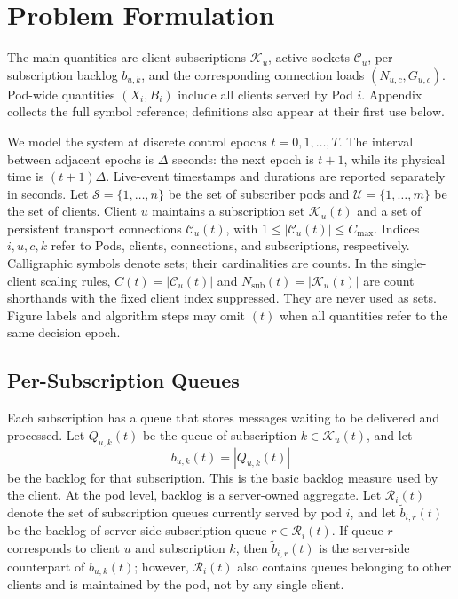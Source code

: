 \section{Problem Formulation}
\label{sec:problem-formulation}

The main quantities are client subscriptions $\mathcal{K}_u$, active sockets
$\mathcal{C}_u$, per-subscription backlog $b_{u,k}$, and the corresponding
connection loads $(N_{u,c},G_{u,c})$. Pod-wide quantities $(X_i,B_i)$ include
all clients served by Pod $i$. Appendix~ collects the full
symbol reference; definitions also appear at their first use below.

We model the system at discrete control epochs $t=0,1,\ldots,T$. The interval
between adjacent epochs is $\Delta$ seconds: the next epoch is $t+1$, while
its physical time is $(t+1)\Delta$. Live-event timestamps and durations are
reported separately in seconds. Let
$\mathcal{S}=\{1,\ldots,n\}$ be the set of subscriber pods and
$\mathcal{U}=\{1,\ldots,m\}$ be the set of clients. Client $u$ maintains a
subscription set $\mathcal{K}_u(t)$ and a set of persistent transport
connections $\mathcal{C}_u(t)$, with
$1\leq |\mathcal{C}_u(t)|\leq C_{\max}$.
Indices $i,u,c,k$ refer to Pods, clients, connections, and subscriptions,
respectively. Calligraphic symbols denote sets; their cardinalities are
counts. In the single-client scaling rules, $C(t)=|\mathcal{C}_u(t)|$ and
$N_{\mathrm{sub}}(t)=|\mathcal{K}_u(t)|$ are count shorthands with the fixed client
index suppressed. They are never used as sets. Figure labels and algorithm
steps may omit $(t)$ when all quantities refer to the same decision epoch.

\subsection{Per-Subscription Queues}

Each subscription has a queue that stores messages waiting to be delivered and
processed. Let $Q_{u,k}(t)$ be the queue of subscription
$k\in\mathcal{K}_u(t)$, and let
\begin{equation}
	b_{u,k}(t)=|Q_{u,k}(t)|
\end{equation}
be the backlog for that subscription. This is the basic backlog measure used
by the client. At the pod level, backlog is a
server-owned aggregate. Let $\mathcal{R}_i(t)$ denote the set of subscription
queues currently served by pod $i$, and let $\tilde{b}_{i,r}(t)$ be the backlog
of server-side subscription queue $r\in\mathcal{R}_i(t)$. If queue $r$
corresponds to client $u$ and subscription $k$, then $\tilde{b}_{i,r}(t)$ is
the server-side counterpart of $b_{u,k}(t)$; however, $\mathcal{R}_i(t)$ also
contains queues belonging to other clients and is maintained by the pod, not by
any single client.


